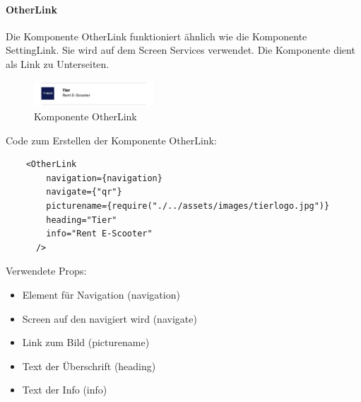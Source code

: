 \paragraph{OtherLink}Die Komponente OtherLink funktioniert ähnlich wie die Komponente SettingLink. Sie wird auf dem Screen Services verwendet. Die Komponente dient als Link zu Unterseiten.\\
\begin{figure}[H]
  \centering
  \includegraphics[width=0.4\textwidth]{images/app-screenshots/otherlink.png}
  \caption{Komponente OtherLink}
  \label{fig:otherlink}
\end{figure}
Code zum Erstellen der Komponente OtherLink:\\
\begin{verbatim}
    <OtherLink
        navigation={navigation}
        navigate={"qr"}
        picturename={require("./../assets/images/tierlogo.jpg")}
        heading="Tier"
        info="Rent E-Scooter"
      />
\end{verbatim}
Verwendete Props:
\begin{itemize}
  \item Element für Navigation (navigation)
  \item Screen auf den navigiert wird (navigate)
  \item Link zum Bild (picturename)
  \item Text der Überschrift (heading)
  \item Text der Info (info)
\end{itemize}


